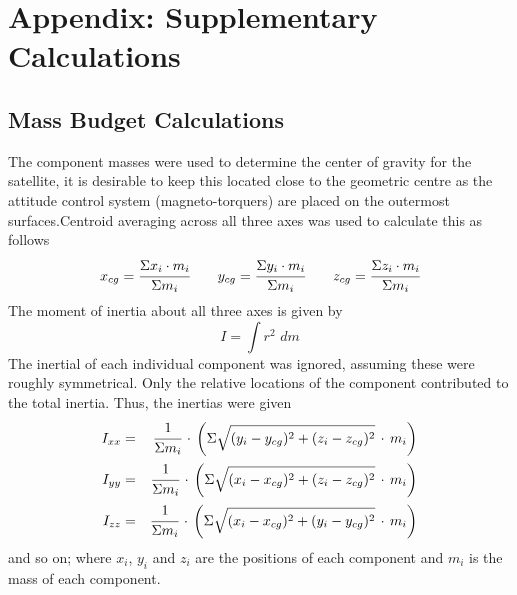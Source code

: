 \section{Appendix: Supplementary Calculations}

\subsection{Mass Budget Calculations} \label{app:mass}
The component masses were used to determine the center of gravity for the satellite, it is desirable to keep this located close to the geometric centre as the attitude control system (magneto-torquers) are placed on the outermost surfaces.Centroid averaging across all three axes was used to calculate this as follows
\[
x_{cg} = \cfrac{\Sigma x_i\cdot m_i}{\Sigma m_i} \qquad y_{cg} = \cfrac{\Sigma y_i\cdot m_i}{\Sigma m_i} \qquad z_{cg} = \cfrac{\Sigma z_i\cdot m_i}{\Sigma m_i}
\]
\noindent
The moment of inertia about all three axes is given by
\[ I = \int r^2\,\,dm \]
\noindent
The inertial of each individual component was ignored, assuming these were roughly symmetrical. Only the relative locations of the component contributed to the total inertia. Thus, the inertias were given
\begin{eqnarray} 
    I_{xx} &=& \cfrac{1}{\Sigma m_i}\,\cdot\,\left( \Sigma \sqrt{(y_i-y_{cg})^2+(z_i-z_{cg})^2}\,\cdot\,m_i \right) \\
    I_{yy} &=& \cfrac{1}{\Sigma m_i}\,\cdot\,\left( \Sigma \sqrt{(x_i-x_{cg})^2+(z_i-z_{cg})^2}\,\cdot\,m_i \right) \\
    I_{zz} &=& \cfrac{1}{\Sigma m_i}\,\cdot\,\left( \Sigma \sqrt{(x_i-x_{cg})^2+(y_i-y_{cg})^2}\,\cdot\,m_i \right) 
    \end{eqnarray} 
    \noindent
    and so on; where $x_i$, $y_i$ and $z_i$ are the positions of each component and $m_i$ is the mass of each component. 

